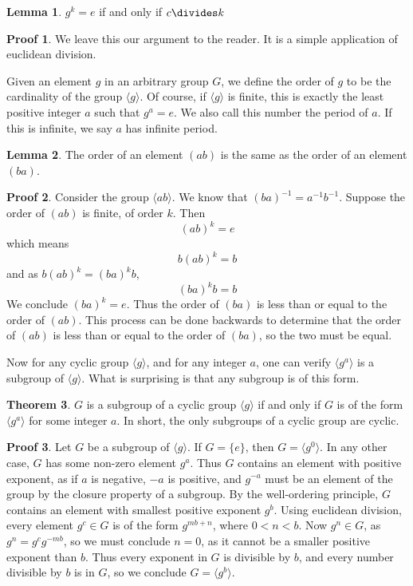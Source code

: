 \documentclass[12pt]{amsbook}
\theoremstyle{definition}
\newtheorem{theorem}{Theorem}[chapter]
\newtheorem{lemma}[theorem]{Lemma}
\newtheorem*{prf}{Proof}
\newcommand{\gen}[1]{\langle #1 \rangle} %
\begin{document}
\begin{lemma} $g^k = e$ if and only if $c \divides k$ \end{lemma}
\begin{prf} We leave this our argument to the reader. It is a simple application of euclidean division.
\end{prf}

Given an element $g$ in an arbitrary group $G$, we define the order of $g$ to be the cardinality of the group $\gen{g}$. Of course, if $\gen{g}$ is finite, this is exactly the least positive integer $a$ such that $g^a = e$. We also call this number the period of $a$. If this is infinite, we say $a$ has infinite period.

\begin{lemma} The order of an element $(ab)$ is the same as the order of an element $(ba)$. \end{lemma}
\begin{prf}
    Consider the group $\gen{ab}$. We know that $(ba)^{-1} = a^{-1}b^{-1}$. Suppose the order of $(ab)$ is finite, of order $k$. Then
    \[ (ab)^k = e \]
    which means
    \[ b(ab)^k = b \]
    and as $b(ab)^k = (ba)^k b$,
    \[ (ba)^k b = b \]
    We conclude $(ba)^k = e$. Thus the order of $(ba)$ is less than or equal to the order of $(ab)$. This process can be done backwards to determine that the order of $(ab)$ is less than or equal to the order of $(ba)$, so the two must be equal.
\end{prf}

Now for any cyclic group $\gen{g}$, and for any integer $a$, one can verify $\gen{g^a}$ is a subgroup of $\gen{g}$. What is surprising is that any subgroup is of this form.

\begin{theorem}
    $G$ is a subgroup of a cyclic group $\gen{g}$ if and only if $G$ is of the form $\gen{g^a}$ for some integer $a$. In short, the only subgroups of a cyclic group are cyclic.
\end{theorem}
\begin{prf}
    Let $G$ be a subgroup of $\gen{g}$. If $G = \{ e \}$, then $G = \gen{g^0}$. In any other case, $G$ has some non-zero element $g^a$. Thus $G$ contains an element with positive exponent, as if $a$ is negative, $-a$ is positive, and $g^{-a}$ must be an element of the group by the closure property of a subgroup. By the well-ordering principle, $G$ contains an element with smallest positive exponent $g^b$. Using euclidean division, every element $g^c \in G$ is of the form $g^{mb + n}$, where $0 < n < b$. Now $g^n \in G$, as $g^n = g^cg^{-mb}$, so we must conclude $n = 0$, as it cannot be a smaller positive exponent than $b$. Thus every exponent in $G$ is divisible by $b$, and every number divisible by $b$ is in $G$, so we conclude $G = \gen{g^b}$.
\end{prf}
\end{document}
